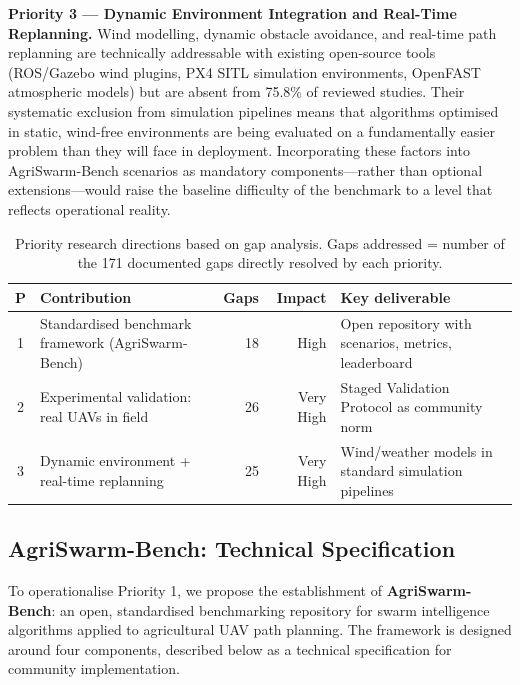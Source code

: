 \documentclass[review,3p,times]{elsarticle}
\begin{document}
\textbf{Priority 3 --- Dynamic Environment Integration and Real-Time Replanning.} Wind modelling, dynamic obstacle avoidance, and real-time path replanning are technically addressable with existing open-source tools (ROS/Gazebo wind plugins, PX4 SITL simulation environments, OpenFAST atmospheric models) but are absent from 75.8\% of reviewed studies. Their systematic exclusion from simulation pipelines means that algorithms optimised in static, wind-free environments are being evaluated on a fundamentally easier problem than they will face in deployment. Incorporating these factors into AgriSwarm-Bench scenarios as mandatory components---rather than optional extensions---would raise the baseline difficulty of the benchmark to a level that reflects operational reality.

\begin{table}[htbp]
\centering
\caption{Priority research directions based on gap analysis. Gaps addressed = number of the 171 documented gaps directly resolved by each priority.}
\label{tab:priorities}
\begin{tabularx}{\textwidth}{clrrX}
\toprule
\textbf{P} & \textbf{Contribution} & \textbf{Gaps} & \textbf{Impact} & \textbf{Key deliverable} \\
\midrule
1 & Standardised benchmark framework (AgriSwarm-Bench) & 18 & High & Open repository with scenarios, metrics, leaderboard \\
2 & Experimental validation: real UAVs in field & 26 & Very High & Staged Validation Protocol as community norm \\
3 & Dynamic environment + real-time replanning & 25 & Very High & Wind/weather models in standard simulation pipelines \\
\bottomrule
\end{tabularx}
\end{table}

\subsection{AgriSwarm-Bench: Technical Specification}

To operationalise Priority 1, we propose the establishment of \textbf{AgriSwarm-Bench}: an open, standardised benchmarking repository for swarm intelligence algorithms applied to agricultural UAV path planning. The framework is designed around four components, described below as a technical specification for community implementation.
\end{document}
